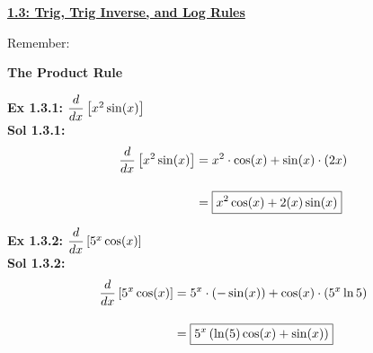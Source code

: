 \textbf{\underline{\large{1.3: Trig, Trig Inverse, and Log Rules}}} \par

Remember:
\begin{center}
\end{center}

\begin{center}
\end{center}

\newpage

\textbf{\large{The Product Rule}} \par

\textbf{Ex 1.3.1: } $\dfrac{d}{dx} \left[x^2\sin (x)\right]$ \\[11pt]
\textbf{Sol 1.3.1: } \begin{align*}
    \dfrac{d}{dx} \left[x^2\sin (x)\right] & = x^2 \cdot \cos (x) + \sin (x) \cdot (2x) \\[11pt]
    & = \boxed{x^2\cos (x) + 2(x)\sin (x)}
\end{align*} 

\textbf{Ex 1.3.2: } $\dfrac{d}{dx} \left[5^x \cos (x)\right]$ \\[11pt]
\textbf{Sol 1.3.2: } \begin{align*}
    \dfrac{d}{dx} \left[5^x \cos (x)\right] & = 5^x \cdot (-\sin (x)) + \cos (x) \cdot (5^x \ln 5) \\[11pt]
    & = \boxed{5^x \left(\ln (5)\cos (x) + \sin(x)\right)}
\end{align*}


